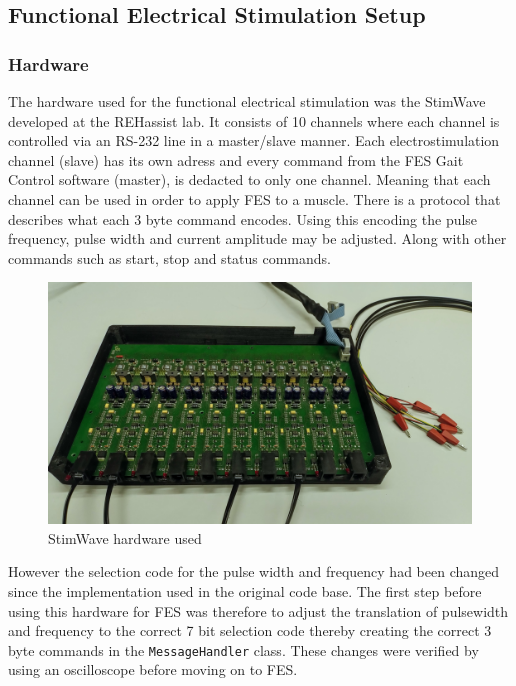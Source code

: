 \subsection{Functional Electrical Stimulation Setup}

\subsubsection{Hardware}
The hardware used for the functional electrical stimulation was the StimWave developed at the REHassist lab. It consists of 10 channels where each channel is controlled via an RS-232 line in a master/slave manner. Each electrostimulation channel (slave) has its own adress and every command from the FES Gait Control software (master), is dedacted to only one channel. Meaning that each channel can be used in order to apply FES to a muscle. There is a protocol that describes what each 3 byte command encodes. Using this encoding the pulse frequency, pulse width and current amplitude may be adjusted. Along with other commands such as start, stop and status commands. 

\begin{figure} [h]
    \centering
    \includegraphics[width=0.8\linewidth]{images/stimwave.jpg}
    \caption{StimWave hardware used}
    \label{fig:enter-label}
\end{figure}

However the selection code for the pulse width and frequency had been changed since the implementation used in the original code base. The first step before using this hardware for FES was therefore to adjust the translation of pulsewidth and frequency to the correct 7 bit selection code thereby creating the correct 3 byte commands in the \texttt{MessageHandler} class. These changes were verified by using an oscilloscope before moving on to FES. 


